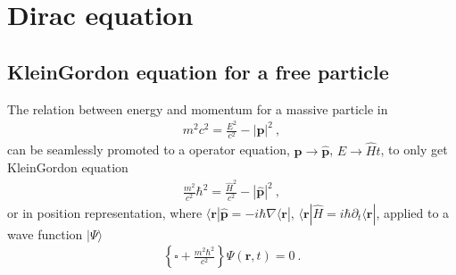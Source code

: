 \documentclass[letterpaper,10pt,english]{jupyterBook}
\begin{document}
\sphinxstepscope


\section{Dirac equation}
\label{\detokenize{ch/quantum-mechanics/relativistic-qm/dirac-equation:dirac-equation}}\label{\detokenize{ch/quantum-mechanics/relativistic-qm/dirac-equation:quantum-mechanics-relativistic-dirac-equation}}\label{\detokenize{ch/quantum-mechanics/relativistic-qm/dirac-equation::doc}}

\subsection{Klein\sphinxhyphen{}Gordon equation for a free particle}
\label{\detokenize{ch/quantum-mechanics/relativistic-qm/dirac-equation:klein-gordon-equation-for-a-free-particle}}\label{\detokenize{ch/quantum-mechanics/relativistic-qm/dirac-equation:quantum-mechanics-relativistic-dirac-equation-klein-gordon-free}}
\sphinxAtStartPar
The relation between energy and momentum for a massive particle in {\hyperref[\detokenize{ch/relativity-special/notes:relativity-special-notes}]{}}
\begin{equation}\label{equation:ch/quantum-mechanics/relativistic-qm/dirac-equation:eq:dirac-eq:einstein:en-mom}
\begin{split}m^2 c^2 = \frac{E^2}{c^2} - | \mathbf{p} |^2 \ ,\end{split}
\end{equation}
\sphinxAtStartPar
can be seamlessly promoted to a operator equation, \(\mathbf{p} \rightarrow \hat{\mathbf{p}}\), \(E \rightarrow \hat{H}t\), to only get Klein\sphinxhyphen{}Gordon equation
\begin{equation*}
\begin{split} \frac{m^2}{c^2}{\hbar^2} = \frac{\hat{H}^2}{c^2} - |\hat{\mathbf{p}}|^2 \ ,\end{split}
\end{equation*}
\sphinxAtStartPar
or in position representation, where \(\langle \mathbf{r} | \hat{\mathbf{p}} = - i \hbar \nabla \langle \mathbf{r} |\), \(\langle \mathbf{r} | \hat{H} = i \hbar \partial_t \langle \mathbf{r} |\), applied to a wave function \(| \Psi \rangle\)
\begin{equation*}
\begin{split}\left\{ \square + \frac{m^2 \hbar^2}{c^2} \right\} \Psi(\mathbf{r},t) = 0 \ .\end{split}
\end{equation*}
\end{document}

